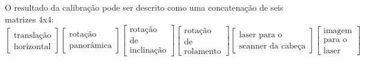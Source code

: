O resultado da calibração pode ser descrito como uma concatenação de seis matrizes 4x4:
\[
\begin{bmatrix}
\text{translação} \\ 
\text{horizontal}
\end{bmatrix}
\begin{bmatrix}
\text{rotação} \\ 
\text{panorâmica}
\end{bmatrix}
\begin{bmatrix}
\text{rotação} \\
\text{de} \\
\text{inclinação}
\end{bmatrix}
\begin{bmatrix}
\text{rotação} \\
\text{de} \\
\text{rolamento}
\end{bmatrix}
\begin{bmatrix}
\text{laser para o} \\
\text{scanner }
\text{da cabeça}
\end{bmatrix}
\begin{bmatrix}
\text{imagem} \\
\text{para o} \\
\text{laser}
\end{bmatrix}
\]




